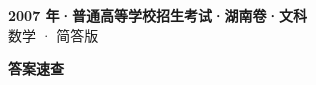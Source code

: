 \documentclass[zihao=-4, a4paper]{ctexart}
\begin{document}
\begin{center}
  {\Large\bfseries 2007 年·普通高等学校招生考试·湖南卷·文科}\\[4pt]
  {\large 数学 · 简答版}
\end{center}
\medskip
{}

\clearpage
{}
\begin{center}{\Large\bfseries 答案速查}\end{center}
\medskip

\end{document}
